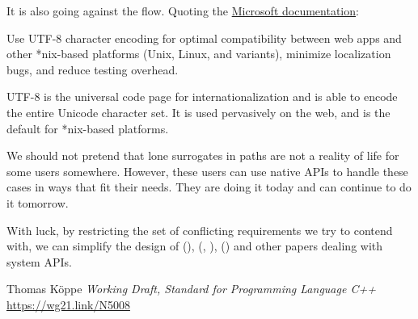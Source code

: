 \documentclass{wg21}
\begin{document}
\pagebreak
It is also going against the flow. Quoting the \href{https://learn.microsoft.com/en-us/windows/apps/design/globalizing/use-utf8-code-page}{Microsoft documentation}:
\begin{quoteblock}
Use UTF-8 character encoding for optimal compatibility between web apps and other *nix-based platforms (Unix, Linux, and variants), minimize localization bugs, and reduce testing overhead.

UTF-8 is the universal code page for internationalization and is able to encode the entire Unicode character set. It is used pervasively on the web, and is the default for *nix-based platforms.
\end{quoteblock}


We should not pretend that lone surrogates in paths are not a reality of life for some users somewhere.
However, these users can use native APIs to handle these cases in ways that fit their needs.
They are doing it today and can continue to do it tomorrow.

With luck, by restricting the set of conflicting requirements we try to contend with, we can simplify the
design of  (),  (, ),
 () and other papers dealing with system APIs.




\renewcommand{\section}[2]{}%

\begin{thebibliography}{9}



Thomas Köppe
\emph{Working Draft, Standard for Programming Language C++}\newline
\url{https://wg21.link/N5008}


\end{thebibliography}
\end{document}
